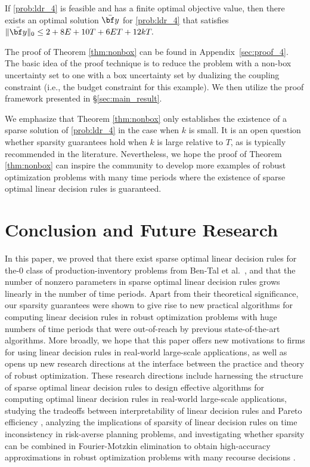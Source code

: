 \documentclass[nonblindrev,mnsc]{informs3} %
\newcommand{\by}{{\bf y}}
\begin{document}
\begin{theorem} \label{thm:nonbox}
If \eqref{prob:ldr_4} is feasible and has a finite optimal objective value, then there exists an optimal solution $\bar{\by}$ for \eqref{prob:ldr_4} that satisfies $\| \bar{\by} \|_0 \le  2 + 8E + 10T + 6ET + 12kT.$
\end{theorem}
The proof of Theorem \ref{thm:nonbox} can be found in Appendix~\ref{sec:proof_4}. The basic idea of the proof technique is to reduce the problem with a non-box uncertainty set to one with a box uncertainty set by dualizing the coupling constraint (i.e., the budget constraint for this example). We then  utilize the proof framework presented in \S\ref{sec:main_result}.

We emphasize that Theorem \ref{thm:nonbox} only establishes the existence of a sparse solution of \eqref{prob:ldr_4} in the case when $k$ is small. It is an open question whether sparsity guarantees hold when $k$ is large relative to $T$, as is typically recommended in the literature. 
Nevertheless, we hope the proof of Theorem \ref{thm:nonbox} can inspire the community to develop more examples of robust optimization problems with many time periods where the existence of sparse optimal linear decision rules is guaranteed.
  
\section{Conclusion and Future  Research} \label{sec:conclusion}

In this paper, we proved that there  exist sparse optimal linear decision rules for the-0 class of production-inventory problems from Ben-Tal et al.~\cite{ben2004adjustable}, and that the number of nonzero parameters in sparse optimal linear decision rules grows linearly in the number of time periods. 
Apart from their theoretical significance, our sparsity guarantees were shown to give rise to new practical algorithms for computing linear decision rules in robust optimization problems with huge numbers of time periods that were  out-of-reach by previous state-of-the-art algorithms. 
More broadly, we hope that this paper offers new motivations to firms for using linear decision rules in real-world large-scale applications, as well as opens up new research directions at the interface  between the practice and theory of robust optimization. These research directions include harnessing the structure of sparse optimal linear decision rules to design  effective algorithms for computing optimal linear decision rules in real-world large-scale applications, studying the tradeoffs between interpretability of linear decision rules and Pareto efficiency \cite{iancu2014pareto,bertsimas2020pareto}, analyzing the implications of sparsity of linear decision rules on time inconsistency in risk-averse planning problems, and investigating whether sparsity can be combined in Fourier-Motzkin elimination to obtain high-accuracy approximations in robust optimization problems with many recourse decisions \cite{zhen2018adjustable}. 
\end{document}
